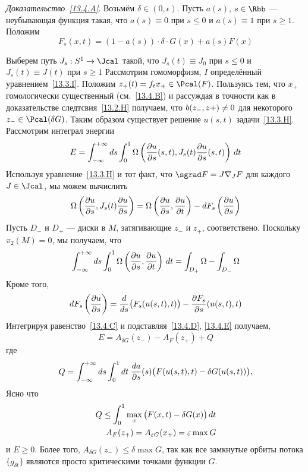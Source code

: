 \noindent\textit{Доказательство~\ref{13.4.A}}.
Возьмём $\delta\in(0,\epsilon)$.
Пусть $a(s)$, $s\in\Rbb$ --- неубывающая функция такая, что
$a(s)\equiv0$ при $s\leq0$ и $a(s)\equiv1$ при $s\geq1$.
Положим
\[
F_{s}(x, t) = (1 - a(s))\cdot\delta\cdot G(x) + a(s)F(x)
\]

Выберем путь $J_{s}:S^{1}\to\Jcal$ такой, что $J_{s}(t)\equiv J_{0}$
при $s\leq0$ и $J_{s}(t)\equiv J(t)$ при $s\geq1$
Рассмотрим гомоморфизм, $I$ определённый уравнением~\ref{13.3.I}.
Положим $z_{+}(t)=f_{t}x_{+}\in\Pcal(F)$.
Пользуясь тем, что $x_{+}$ гомологически существенный
(см.~\ref{13.4.B}) и рассуждая в точности как в доказательстве
следтсвия~\ref{13.2.H} получаем, что $b(z_{-}, z+)\z\neq 0$ для
некоторого $z_{-}\in\Pcal(\delta G)$.
Таким образом существует решение $u(s, t)$ задачи~\ref{13.3.H}.
Рассмотрим интеграл энергии
\[
E=
\int_{-\infty}^{+\infty}d s
\int_{0}^{1}
\Omega\left(\frac{\partial u}{\partial s}(s,t),
J_{s}(t)\frac{\partial u}{\partial s}(s,t)\right)
\,d t
\]
Используя уравнение~\ref{13.3.H} и тот факт, что
$\sgrad F=J\nabla_{J}F$ для каждого $J\in\Jcal$, мы можем вычислить
\begin{equation}\label{13.4.C}
  \Omega\left(\frac{\partial u}{\partial s},
  J_{s}(t)\frac{\partial u}{\partial s}\right)
  =
  \Omega\left(\frac{\partial u}{\partial s},
         \frac{\partial u}{\partial t}\right)
  -
  d F_{s}\left(\frac{\partial u}{\partial s}\right)
\end{equation}
Пусть $D_{-}$ и $D_{+}$ ---  диски в $M$,
затягивающие $z_{-}$ и
$z_{+}$, соответствено.  Поскольку $π_{2}(M)=0$, мы получаем, что
\begin{equation}\label{13.4.D}
  \int_{-\infty}^{+\infty}d s
  \int_{0}^{1}
  \Omega\left(\frac{\partial u}{\partial s},
  \frac{\partial u}{\partial t}\right)
  \,d t
  =
  \int_{D_{+}}\Omega-\int_{D_{-}}\Omega
\end{equation}
Кроме того,
\begin{equation}\label{13.4.E}
  d F_{s}\left(\frac{\partial u}{\partial s}\right)
  =
  \frac{d}{d s}\big(F_{s}(u(s,t),t)\big) -
  \frac{\partial F_{s}}{\partial s}(u(s,t),t)  
\end{equation}
Интегрируя равенство~\ref{13.4.C} и подставляя~\ref{13.4.D}, \ref{13.4.E}
получаем,
\[
E=A_{\delta G}(z_{-})-A_{F}(z_{+})+Q
\]
где
\[
Q=\int_{-\infty}^{+\infty}d s
  \int_{0}^{1}d t\;
  \frac{d a}{\partial s}(s)\big(F(u(s,t),t)-\delta G(u(s,t))\big),
\]
Ясно что
\begin{align*}
  Q\leq
  \int_{0}^{1} \max_{x}\big(F(x,t)-\delta G(x)\big)\,d t\\
  A_{F}(z_{+})=A_{\varepsilon G}(x_{+})=\varepsilon\max G
\end{align*}
и $E\geq0$.
Более того, $A_{\delta G}(z_{-})\leq \delta\max G$, так как все
замкнутые орбиты потока $\{g_{\delta t}\}$ являются просто
критическими точками функции $G$.

